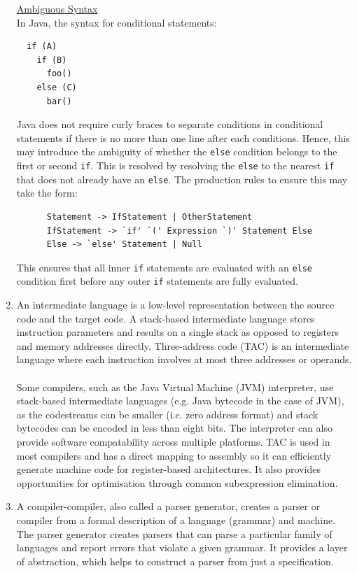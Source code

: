 \documentclass[a4paper, 12pt, oneside]{book}
\begin{document}
\begin{enumerate}
    \underline{Ambiguous Syntax}\\

    In Java, the syntax for conditional statements:
    \begin{verbatim}
  if (A)
    if (B)
      foo()
    else (C)
      bar()
\end{verbatim}
    Java does not require curly braces to separate conditions in conditional statements if there is no more than one line after each conditions. Hence, this may introduce the ambiguity of whether the \texttt{else} condition belongs to the first or second \texttt{if}. This is resolved by resolving the \texttt{else} to the nearest \texttt{if} that does not already have an \texttt{else}. The production rules to ensure this may take the form:
    \begin{verbatim}
      Statement -> IfStatement | OtherStatement
      IfStatement -> `if' `(' Expression `)' Statement Else
      Else -> `else' Statement | Null
    \end{verbatim}
    This ensures that all inner \texttt{if} statements are evaluated with an \texttt{else} condition first before any outer \texttt{if} statements are fully evaluated.

  \item
    An intermediate language is a low-level representation between the source code and the target code. A stack-based intermediate language stores instruction parameters and results on a single stack as opposed to registers and memory addresses directly. Three-address code (TAC) is an intermediate language where each instruction involves at most three addresses or operands.\\
    \\
    Some compilers, such as the Java Virtual Machine (JVM) interpreter, use stack-based intermediate languages (e.g. Java bytecode in the case of JVM), as the codestreams can be smaller (i.e. zero address format) and stack bytecodes can be encoded in less than eight bits. The interpreter can also provide software compatability across multiple platforms. TAC is used in most compilers and has a direct mapping to assembly so it can efficiently generate machine code for register-based architectures. It also provides opportunities for optimisation through common subexpression elimination.

  \item
    A compiler-compiler, also called a parser generator, creates a parser or compiler from a formal description of a language (grammar) and machine. The parser generator creates parsers that can parse a particular family of languages and report errors that violate a given grammar. It provides a layer of abstraction, which helps to construct a parser from just a specification.


\end{enumerate}
\end{document}
